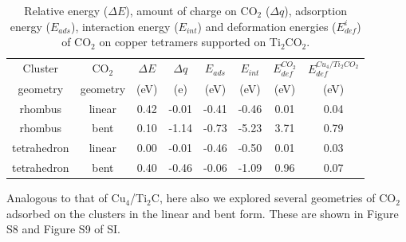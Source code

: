 \begin{table}
 
 \label{tab:05}
  \begin{center}
   
    \begin{tabular}{|*{8}{c|}}
    \hline
  Cluster & CO$_2$ & $\Delta E$ & $\Delta q$ & $E_{ads}$ & $E_{int}$ & $E_{def}^{CO_2}$& $E_{def}^{Cu_{4}/Ti_{2}CO_{2}}$\\
         geometry          &        geometry         & (eV) & (e) & (eV) & (eV) & (eV) & (eV) \\
    \hline
    rhombus   &  linear  & 0.42 & -0.01 & -0.41 & -0.46 & 0.01 & 0.04\\
    \hline
    rhombus & bent & 0.10 & -1.14 & -0.73 & -5.23 & 3.71 & 0.79 \\
    \hline
    tetrahedron & linear & 0.00 & -0.01 & -0.46 & -0.50 & 0.01 & 0.03 \\
    \hline
    tetrahedron & bent & 0.40 & -0.46 & -0.06 & -1.09 & 0.96 & 0.07 \\
			\hline 
			  



  \end{tabular}
  \end{center}
  \caption{Relative energy ($\Delta E$), amount of charge on CO$_2$ ($\Delta q$), adsorption energy ($E_{ads}$),
  interaction energy ($E_{int}$) and deformation energies ($E_{def}^i$) of CO$_2$ on copper tetramers supported on Ti$_2$CO$_2$.}
\end{table} 

Analogous to that of Cu$_4$/Ti$_2$C, here also we explored several geometries of CO$_2$ adsorbed on the clusters in the linear and bent form. These are shown in Figure S8 and Figure S9 of SI.

